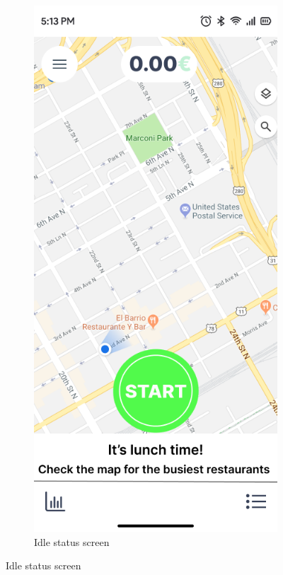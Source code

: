 \begin{figure}[H]
\begin{subfigure}[b]{0.48\textwidth}
        \includegraphics[width=\textwidth]{images/go_screen.png}
        \caption{Idle status screen}

\end{subfigure}
\end{figure}
